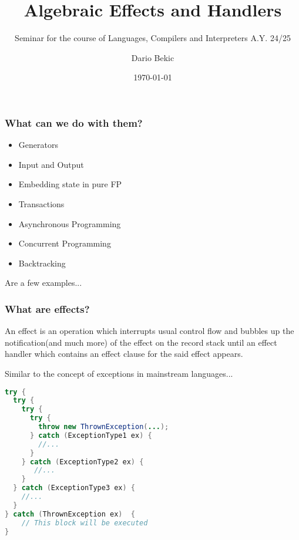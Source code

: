 \documentclass[t]{beamer}
\title{Algebraic Effects and Handlers}
\author{Dario Bekic}
\subtitle{Seminar for the course of Languages, Compilers and Interpreters
A.Y. 24/25}
\date{\today}
\begin{document}
\begin{frame}
  \titlepage
\end{frame}

\begin{frame}
  \frametitle{What can we do with them?}
   \begin{itemize}
  \item Generators
  \item Input and Output
  \item Embedding state in pure FP 
  \item Transactions
  \item Asynchronous Programming
  \item Concurrent Programming
  \item Backtracking
   \end{itemize}
   Are a few examples...
\end{frame}

\begin{frame}[fragile]
\frametitle{What are effects?}

An effect is an operation which interrupts usual control flow and bubbles up the notification(and much more) of the effect on the record stack until an \alert{effect handler} which contains an \alert{effect clause} for the said effect appears.

Similar to the concept of exceptions in mainstream languages...

\begin{lstlisting}[language=java, basicstyle=\scriptsize\ttfamily, breaklines=true, xleftmargin=0em, lineskip=-1pt, aboveskip=0pt, belowskip=0pt, moredelim={[is][\color{red}]{STARTRC}{ENDRC}}]
try {
  try {
    try {
      try {
	    throw new ThrownException(...);
      } catch (ExceptionType1 ex) {
		//...
      }
    } catch (ExceptionType2 ex) {
	   //...	
    }
  } catch (ExceptionType3 ex) {
    //...
  }
} catch (ThrownException ex)  {
	// This block will be executed 
}
\end{lstlisting}

\end{frame}
\end{document}
